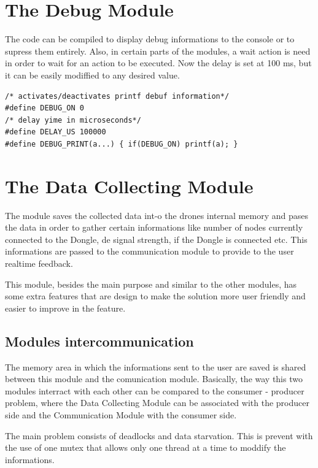 \section{The Debug Module}

The code can be compiled to display debug informations to the console or to supress them entirely. Also, in certain parts of the modules, a wait action is need in order to wait for an action to be executed. Now the delay is set at 100 ms, but it can be easily modiffied to any desired value. 

\lstset{numbers=none, mathescape=true, nolol=false,caption=Data Collection use of mutex,label=lst:task}
\begin{lstlisting}
/* activates/deactivates printf debuf information*/
#define DEBUG_ON 0
/* delay yime in microseconds*/
#define DELAY_US 100000
#define DEBUG_PRINT(a...) { if(DEBUG_ON) printf(a); }
\end{lstlisting}

 

\section{The Data Collecting Module}
 
The module saves the collected data int-o the drones internal memory and pases the data in order to gather certain informations like number of nodes currently connected to the Dongle, de signal strength, if the Dongle is connected etc. This informations are passed to the communication module to provide to the user realtime feedback.

This module, besides the main purpose and similar to the other modules, has some extra features that are design to make the solution more user friendly and easier to improve in the feature.

\subsection{Modules intercommunication}

The memory area in which the informations sent to the user are saved is shared between this module and the comunication module. Basically, the way this two modules interract with each other can be compared to the consumer - producer problem, where the Data Collecting Module can be associated with the producer side and the Communication Module with the consumer side.

The main problem consists of deadlocks and data starvation. This is prevent with the use of one mutex that allows only one thread at a time to moddify the informations.

